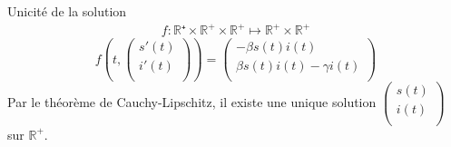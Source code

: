 \documentclass{beamer}
\theoremstyle{plain}
\theoremstyle{definition}
\theoremstyle{remark}
\begin{document}
\begin{frame}{Unicité de la solution}
\begin{align*}
    f: \mathbb{R⁺}\times \mathbb{R^+}\times\mathbb{R^+}\longmapsto \mathbb{R^+}\times\mathbb{R^+}
\end{align*}
\begin{equation*}
    f\left(t,\begin{pmatrix}
    s'(t)\\
    i'(t)\\
    \end{pmatrix}\right)=\begin{pmatrix}- \beta s(t) i(t)\\ \beta s(t) i(t) - \gamma i(t)\\\end{pmatrix}
    \end{equation*}
    \newline
    \newline
    Par le théorème de Cauchy-Lipschitz, il existe une unique solution $\begin{pmatrix}
    s(t)\\
    i(t)\\
    \end{pmatrix}$ sur $\mathbb{R^+}$.
\end{frame}
\end{document}

